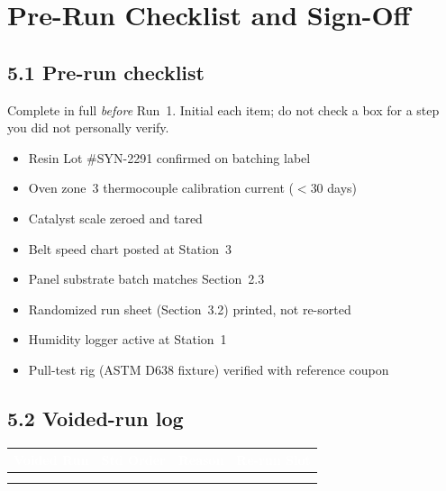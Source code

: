 \section{Pre-Run Checklist and Sign-Off}

\subsection*{5.1 Pre-run checklist}
Complete in full \emph{before} Run~1. Initial each item; do not check a box for a step you did
not personally verify.

\begin{center}
\begin{minipage}{0.48\linewidth}
\begin{itemize}[label=$\square$, itemsep=4pt]
  \item Resin Lot \#SYN-2291 confirmed on batching label
  \item Oven zone~3 thermocouple calibration current (\(<30\) days)
  \item Catalyst scale zeroed and tared
  \item Belt speed chart posted at Station~3
\end{itemize}
\end{minipage}%
\par
\begin{minipage}{0.48\linewidth}
\begin{itemize}[label=$\square$, itemsep=4pt]
  \item Panel substrate batch matches Section~2.3
  \item Randomized run sheet (Section~3.2) printed, not re-sorted
  \item Humidity logger active at Station~1
  \item Pull-test rig (ASTM D638 fixture) verified with reference coupon
\end{itemize}
\end{minipage}
\end{center}

\subsection*{5.2 Voided-run log}
\noindent\begin{tabularx}{\linewidth}{@{}c c Y c@{}}
\toprule
{}
\textcolor{white}{\textbf{Voided Run}} & \textcolor{white}{\textbf{Std Order}} &
\textcolor{white}{\textbf{Reason}} & \textcolor{white}{\textbf{Re-run Slot}} \\
\midrule
 & & & \\
 & & & \\
\bottomrule
\end{tabularx}

